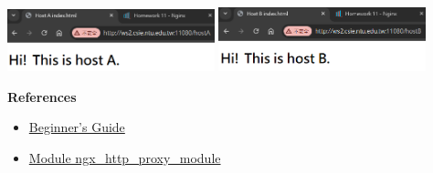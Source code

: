\documentclass[12pt, a4paper]{article}
\begin{document}
\begin{enumerate}[resume]
    \includegraphics[width=0.45\textwidth]{13_hostA.png}
    \includegraphics[width=0.45\textwidth]{13_hostB.png}

    \textbf{References}
    \begin{itemize}
      \item \href{https://nginx.org/en/docs/beginners_guide.html}{Beginner's Guide}
      \item \href{https://nginx.org/en/docs/http/ngx_http_proxy_module.html}{Module ngx\_http\_proxy\_module}
    \end{itemize}
  \end{enumerate}
\end{document}
